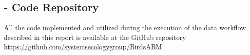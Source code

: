 %
%
%


\clearpage
\appendix
\begin{appendices}
\section{- Code Repository}

All the code implemented and utilized during the execution of the data workflow
described in this report is available at the GitHub repository \href{https://github.com/systemsecologygroup/BirdsABM}{https://github.com/systemsecologygroup/BirdsABM}.

\end{appendices}
